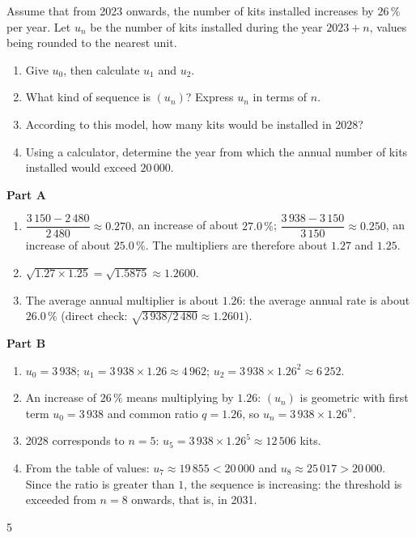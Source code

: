 {Assume that from 2023 onwards, the number of kits installed increases by $26\,\%$ per year. Let $u_n$ be the number of kits installed during the year $2023+n$, values being rounded to the nearest unit.
\begin{enumerate}
\item Give $u_0$, then calculate $u_1$ and $u_2$.
\item What kind of sequence is $(u_n)$? Express $u_n$ in terms of $n$.
\item According to this model, how many kits would be installed in 2028?
\item Using a calculator, determine the year from which the annual number of kits installed would exceed $20\,000$.
\end{enumerate}
}{%
\textbf{Part A}
\begin{enumerate}
\item $\dfrac{3\,150-2\,480}{2\,480}\approx0.270$, an increase of about $27.0\,\%$; $\dfrac{3\,938-3\,150}{3\,150}\approx0.250$, an increase of about $25.0\,\%$. The multipliers are therefore about $1.27$ and $1.25$.
\item $\sqrt{1.27\times1.25}=\sqrt{1.5875}\approx1.2600$.
\item The average annual multiplier is about $1.26$: the average annual rate is about $26.0\,\%$ (direct check: $\sqrt{3\,938/2\,480}\approx1.2601$).
\end{enumerate}
\textbf{Part B}
\begin{enumerate}
\item $u_0=3\,938$; $u_1=3\,938\times1.26\approx4\,962$; $u_2=3\,938\times1.26^2\approx6\,252$.
\item An increase of $26\,\%$ means multiplying by $1.26$: $(u_n)$ is geometric with first term $u_0=3\,938$ and common ratio $q=1.26$, so $u_n=3\,938\times1.26^n$.
\item 2028 corresponds to $n=5$: $u_5=3\,938\times1.26^5\approx12\,506$ kits.
\item From the table of values: $u_7\approx19\,855<20\,000$ and $u_8\approx25\,017>20\,000$. Since the ratio is greater than $1$, the sequence is increasing: the threshold is exceeded from $n=8$ onwards, that is, in 2031.
\end{enumerate}
}{5}

